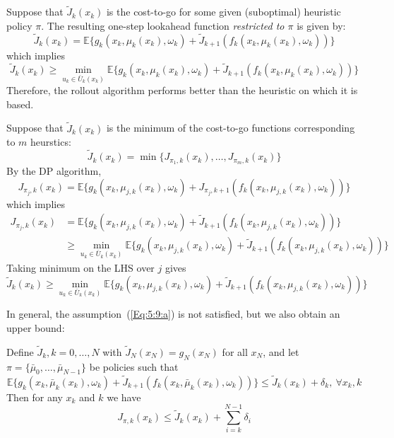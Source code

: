\begin{example}
Suppose that $\tilde{J}_k(x_k)$ is the cost-to-go for some given (suboptimal) heuristic policy $\pi$.
The resulting one-step lookahead function \emph{restricted to $\pi$} is given by:
\[
\tilde{J}_k(x_k)=\mathbb{E}\Bigg\{
g_k(x_k,\mu_k(x_k),\omega_k)
+
\tilde{J}_{k+1}(f_k(x_k,\mu_k(x_k),\omega_k))
\Bigg\}
\]
which implies
\[
\tilde{J}_k(x_k)\ge \min_{u_k\in\bar{U}_k(x_k)}\mathbb{E}\Bigg\{
g_k(x_k,\mu_k(x_k),\omega_k)
+
\tilde{J}_{k+1}(f_k(x_k,\mu_k(x_k),\omega_k))
\Bigg\}
\]
Therefore, the rollout algorithm performs better than the heuristic on which it is based.
\end{example}

\begin{example}
Suppose that $\tilde{J}_k(x_k)$ is the minimum of the cost-to-go functions corresponding to $m$ heurstics:
\[
\tilde{J}_k(x_k) = \min\{J_{\pi_1,k}(x_k),\dots,J_{\pi_m,k}(x_k)\}
\]
By the DP algorithm,
\[
J_{\pi_j,k}(x_k)=\mathbb{E}\Bigg\{
g_k(x_k,\mu_{j,k}(x_k),\omega_k)+J_{\pi_j,k+1}(f_k(x_k,\mu_{j,k}(x_k),\omega_k))
\Bigg\}
\]
which implies
\begin{align*}
J_{\pi_j,k}(x_k)&=\mathbb{E}\Bigg\{
g_k(x_k,\mu_{j,k}(x_k),\omega_k)+\tilde{J}_{k+1}(f_k(x_k,\mu_{j,k}(x_k),\omega_k))
\Bigg\}\\
&\ge
\min_{u_k\in\bar{U}_k(x_k)}\mathbb{E}\Bigg\{
g_k(x_k,\mu_{j,k}(x_k),\omega_k)+\tilde{J}_{k+1}(f_k(x_k,\mu_{j,k}(x_k),\omega_k))
\Bigg\}
\end{align*}
Taking minimum on the LHS over $j$ gives
\[
\tilde{J}_k(x_k)\ge \min_{u_k\in\bar{U}_k(x_k)}\mathbb{E}\Bigg\{
g_k(x_k,\mu_{j,k}(x_k),\omega_k)+\tilde{J}_{k+1}(f_k(x_k,\mu_{j,k}(x_k),\omega_k))
\Bigg\}
\]
\end{example}
In general, the assumption~(\ref{Eq:5:9:a}) is not satisfied, but we also obtain an upper bound:
\begin{proposition}
Define $\tilde{J}_k,k=0,\dots,N$ with $\tilde{J}_N(x_N)=g_N(x_N)$ for all $x_N$, and let $\pi=\{\bar{\mu}_0,\dots,\bar{\mu}_{N-1}\}$ be policies such that
\begin{equation}
\mathbb{E}\{g_k(x_k,\bar{\mu}_k(x_k),\omega_k)
+
\tilde{J}_{k+1}(f_k(x_k,\bar{\mu}_k(x_k),\omega_k))
\}
\le
\tilde{J}_k(x_k)+\delta_k,\ \forall x_k,k
\end{equation}
Then for any $x_k$ and $k$ we have
\[
J_{\pi,k}(x_k)\le \tilde{J}_k(x_k)+\sum_{i=k}^{N-1}\delta_i
\]
\end{proposition}
